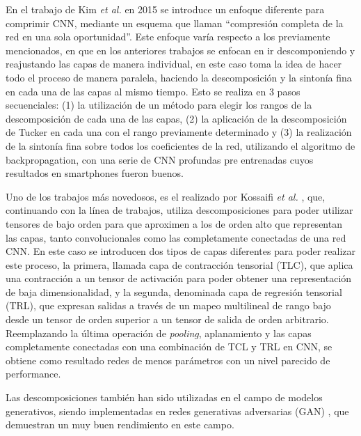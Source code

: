 \documentclass[spanish]{article}
\theoremstyle{definition}
\theoremstyle{remark}
\numberwithin{equation}{section}
\numberwithin{equation}{section} %
\begin{document}
En el trabajo de Kim \textit{et al.} \cite{kim2015compression} en 2015 se introduce un enfoque diferente para comprimir CNN, mediante un esquema que llaman ``compresión completa de la red  en una sola oportunidad''. Este enfoque varía respecto a los previamente mencionados, en que en los anteriores trabajos se enfocan en ir descomponiendo y reajustando las capas de manera individual, en este caso toma la idea de hacer todo el proceso de manera paralela, haciendo la descomposición y la sintonía fina en cada una de las capas al mismo tiempo. Esto se realiza en 3 pasos secuenciales: (1) la utilización de un método para elegir los rangos de la descomposición de cada una de las capas, (2) la aplicación de la descomposición de Tucker en cada una con el rango previamente determinado y (3) la realización de la sintonía fina sobre todos los coeficientes de la red, utilizando el algoritmo de backpropagation, con una serie de CNN profundas pre entrenadas cuyos resultados en smartphones fueron buenos. 
\par
Uno de los trabajos más novedosos, es el realizado por Kossaifi \textit{ et al.} \cite{kossaifi2017tensor}, que, continuando con la línea de trabajos, utiliza descomposiciones para poder utilizar tensores de bajo orden para que aproximen a los de orden alto que representan las capas, tanto convolucionales como las completamente conectadas de una red CNN. En este caso se introducen dos tipos de capas diferentes para poder realizar este proceso, la primera, llamada capa de contracción tensorial (TLC), que aplica una contracción a un tensor de activación para poder obtener una representación de baja dimensionalidad, y la segunda, denominada capa de regresión tensorial (TRL), que expresan salidas a través de un mapeo multilineal de rango bajo desde un tensor de orden superior a un tensor de salida de orden arbitrario. Reemplazando la última operación de \textit{pooling}, aplanamiento y las capas completamente conectadas con una combinación de TCL y TRL en CNN, se obtiene como resultado redes de menos parámetros con un nivel parecido de performance. 
\par
Las descomposiciones también han sido utilizadas en el campo de modelos generativos, siendo implementadas en redes generativas adversarias (GAN) \cite{goodfellow2014generative}, que demuestran un muy buen rendimiento en este campo.
\end{document}
